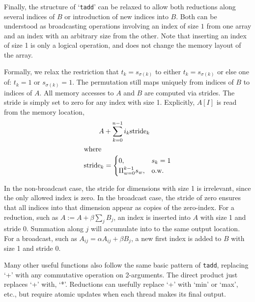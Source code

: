 \documentclass{sigplanconf}
\begin{document}

  Finally, the structure of `{\tt tadd}' can be relaxed to allow both reductions along
several indices of $B$ or introduction of new indices into $B$.  Both can be understood
as broadcasting operations\cite{numpy} involving an index of size $1$ from one
array and an index with an arbitrary size from the other.  Note that inserting an index of size 1
is only a logical operation, and does not change the memory layout of the array.

  Formally, we relax the restriction that $t_k = s_{\sigma(k)}$ to either
$t_k = s_{\sigma(k)}$ or else one of: $t_k = 1$ or $s_{\sigma(k)} = 1$.
The permutation still maps uniquely from indices of $B$ to indices of $A$.
All memory accesses to $A$ and $B$ are computed via strides.
The stride is simply set to zero for any index with size 1.
Explicitly, $A[I]$ is read from the memory location,
\begin{align}
A &+ \sum_{k=0}^{n-1} i_k \text{stride}_k \\
\intertext{where}
\text{stride}_k &= \begin{cases}
0, & s_k = 1 \\
\Pi_{w=0}^{k-1} s_w, & \text{o.w.}
\end{cases}
\end{align}

  In the non-broadcast case, the stride for dimensions with size 1 is irrelevant,
since the only allowed index is zero.  In the broadcast case, the stride of zero
ensures that all indices into that dimension appear as copies of the zero-index.
For a reduction, such as $A := A + \beta \sum_j B_j$,
an index is inserted into $A$ with size 1 and stride 0.
Summation along $j$ will accumulate into to the same output location.
For a broadcast, such as $A_{ij} = \alpha A_{ij} + \beta B_j$, a new first
index is added to $B$ with size 1 and stride 0.

  Many other useful functions also follow the same basic pattern of {\tt tadd},
replacing `+' with any commutative operation on 2-arguments.
The direct product just replaces `+' with, `*'.  Reductions can usefully replace
`+' with `min' or `max', etc., but require atomic updates when each thread makes its
final output.
\end{document}
